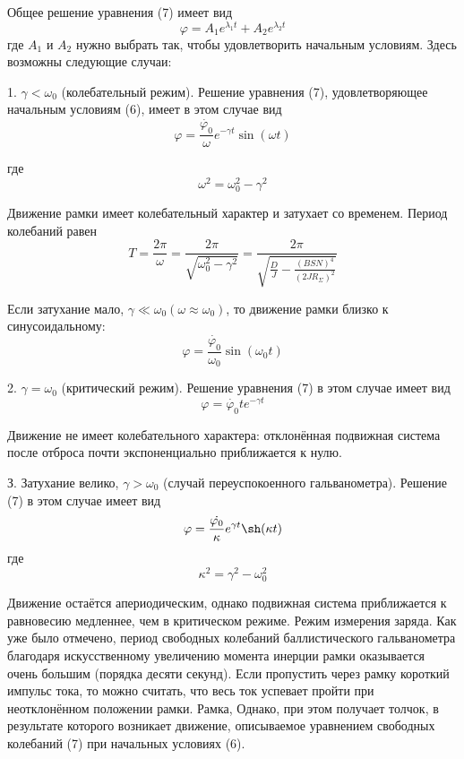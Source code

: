 \documentclass[14pt]{article}
\begin{document}
Общее решение уравнения (7) имеет вид
\begin{equation}
	\varphi = A_1e^{\lambda_1t} + A_2e^{\lambda_2t}
\end{equation}
где $A_1$ и $A_2$ нужно выбрать так, чтобы удовлетворить начальным условиям. Здесь возможны следующие случаи:

1. $\gamma < \omega_0$ (колебательный режим).
Решение уравнения (7), удовлетворяющее начальным условиям (6), имеет в этом случае вид
\begin{equation}
	\varphi = \frac{\dot{\varphi_0}}{\omega}e^{-\gamma t}\sin(\omega t)
\end{equation}

где
\begin{equation}
	\omega^2 = \omega_0^2 - \gamma^2
\end{equation}

Движение рамки имеет колебательный характер и затухает со временем. Период колебаний равен
\begin{equation}
	T = \frac{2\pi}{\omega} = \frac{2\pi}{\sqrt{\omega_0^2 - \gamma^2}} = \frac{2\pi}{\sqrt{\frac{D}{J} - \frac{(BSN)^4}{(2JR_\Sigma)^2}}}
\end{equation}

Если затухание мало, $\gamma \ll \omega_0 (\omega \approx \omega_0)$, то движение рамки близко к синусоидальному:
\begin{equation}
	\varphi = \frac{\dot{\varphi_0}}{\omega_0}\sin(\omega_0t)
\end{equation}

2. $\gamma = \omega_0$ (критический режим). Решение уравнения (7) в этом случае имеет вид
\begin{equation}
	\varphi = \dot{\varphi_0}te^{-\gamma t}
\end{equation}

Движение не имеет колебательного характера: отклонённая подвижная система после отброса почти экспоненциально приближается к нулю.

З. Затухание велико, $\gamma > \omega_0$ (случай переуспокоенного гальванометра). Решение (7) в этом случае имеет вид
\begin{equation}
	\varphi = \frac{\dot{\varphi_0}}{\kappa}e^{\gamma t}\sh(\kappa t)
\end{equation}
где 
$$
	\kappa^2 = \gamma^2 - \omega_0^2
$$

Движение остаётся апериодическим, однако подвижная система приближается к равновесию медленнее, чем в критическом режиме. Режим измерения заряда. Как уже было отмечено, период свободных колебаний баллистического гальванометра благодаря искусственному увеличению момента инерции рамки оказывается очень большим (порядка десяти секунд). Если пропустить через рамку короткий импульс тока, то можно считать, что весь ток успевает пройти при неотклонённом положении рамки. Рамка, Однако, при этом получает толчок, в результате которого возникает движение, описываемое уравнением свободных колебаний (7) при начальных условиях (6).
\end{document}
